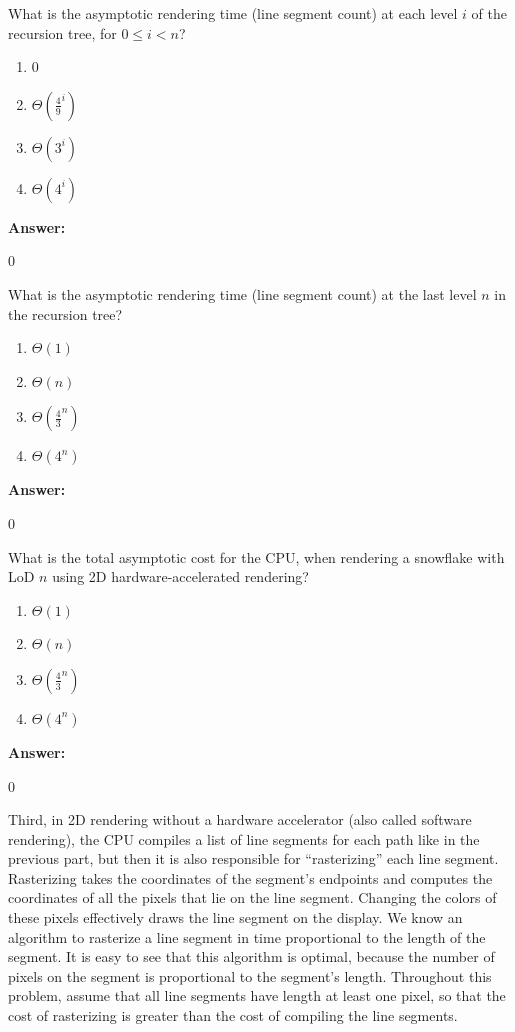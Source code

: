 \documentclass[12pt,twoside]{article}
\newcommand{\answer}{
 \par\medskip
 \textbf{Answer:}
}
\newcommand{\answerIj}{ \answer
0
}
\newcommand{\answerIk}{ \answer
0
}
\newcommand{\answerIl}{ \answer
0
}
\begin{document}
\begin{problems}
\begin{problemparts}
  \problempart {} What is the asymptotic rendering time (line segment count) at
  each level $i$ of the recursion tree, for $0 \le i < n$?
    \begin{enumerate}
      \item 0
      \item $\Theta(\frac{4}{9} ^ i)$
      \item $\Theta(3 ^ i)$
      \item $\Theta(4 ^ i)$
    \end{enumerate}
\answerIj

  \problempart {} What is the asymptotic rendering time (line segment count) at
  the last level $n$ in the recursion tree?
    \begin{enumerate}
      \item $\Theta(1)$
      \item $\Theta(n)$
      \item $\Theta(\frac{4}{3}^n)$
      \item $\Theta(4^n)$
    \end{enumerate}
\answerIk

  \problempart {} What is the total asymptotic cost for the CPU, when rendering
  a snowflake with LoD $n$ using 2D hardware-accelerated rendering?
    \begin{enumerate}
      \item $\Theta(1)$
      \item $\Theta(n)$
      \item $\Theta(\frac{4}{3}^n)$
      \item $\Theta(4^n)$
    \end{enumerate}
\answerIl

\end{problemparts}

Third, in 2D rendering without a hardware accelerator (also called
software rendering), the CPU compiles a list of line segments for each path like
in the previous part, but then it is also responsible for ``rasterizing'' each
line segment. Rasterizing takes the coordinates of the segment's endpoints and
computes the coordinates of all the pixels that lie on the line segment.
Changing the colors of these pixels effectively draws the line segment on the
display. We know an algorithm to rasterize a line segment in time proportional
to the length of the segment. It is easy to see that this algorithm is optimal,
because the number of pixels on the segment is proportional to the segment's
length. Throughout this problem, assume that all line segments have length
at least one pixel, so that the cost of rasterizing is greater than the cost
of compiling the line segments.


\end{problems}
\end{document}
